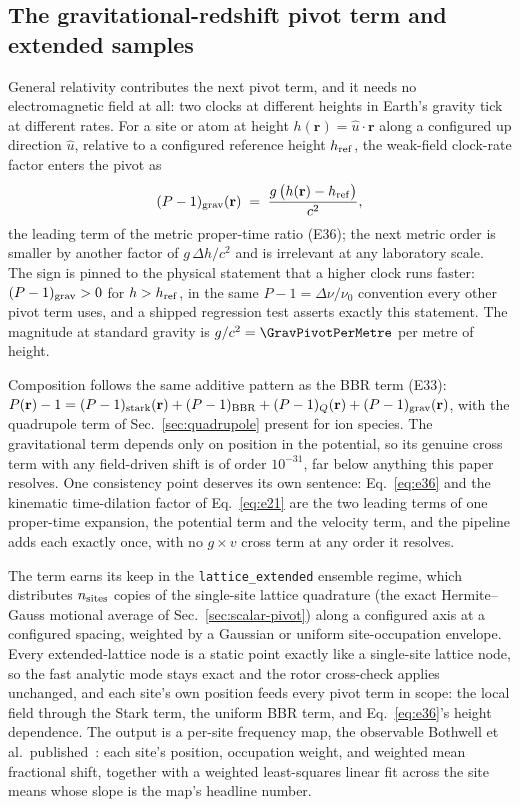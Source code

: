 \documentclass[aps,pra,superscriptaddress,groupedaddress,nofootinbib]{revtex4-2}
\begin{document}
\subsection{The gravitational-redshift pivot term and extended samples}
\label{sec:grav-pivot}

General relativity contributes the next pivot term, and it needs no
electromagnetic field at all: two clocks at different heights in
Earth's gravity tick at different rates. For a site or atom at height
$h(\mathbf{r}) = \hat u\cdot\mathbf{r}$ along a configured up direction
$\hat u$, relative to a configured reference height $h_{\rm ref}$, the
weak-field clock-rate factor enters the pivot as
\begin{equation}
  (P-1)_{\rm grav}(\mathbf{r}) \;=\;
  \frac{g\,\bigl(h(\mathbf{r}) - h_{\rm ref}\bigr)}{c^2} ,
  \label{eq:e36}
\end{equation}
the leading term of the metric proper-time ratio (E36); the next metric
order is smaller by another factor of $g\,\Delta h/c^2$ and is
irrelevant at any laboratory scale. The sign is pinned to the physical
statement that a higher clock runs faster: $(P-1)_{\rm grav}>0$ for
$h>h_{\rm ref}$, in the same $P-1=\Delta\nu/\nu_0$ convention every
other pivot term uses, and a shipped regression test asserts exactly
this statement. The magnitude at standard gravity is
$g/c^2=\GravPivotPerMetre$ per metre of height.

Composition follows the same additive pattern as the BBR term (E33):
$P(\mathbf{r})-1 = (P-1)_{\rm stark}(\mathbf{r}) + (P-1)_{\rm BBR} +
(P-1)_{Q}(\mathbf{r}) + (P-1)_{\rm grav}(\mathbf{r})$, with the
quadrupole term of Sec.~\ref{sec:quadrupole} present for ion species.
The gravitational term depends only on position in the potential, so
its genuine cross term with any field-driven shift is of order
$10^{-31}$, far below anything this paper resolves. One consistency
point deserves its own sentence: Eq.~\eqref{eq:e36} and the kinematic
time-dilation factor of Eq.~\eqref{eq:e21} are the two leading terms of
one proper-time expansion, the potential term and the velocity term,
and the pipeline adds each exactly once, with no $g\times v$ cross term
at any order it resolves.

The term earns its keep in the \texttt{lattice\_extended} ensemble
regime, which distributes $n_{\rm sites}$ copies of the single-site
lattice quadrature (the exact Hermite--Gauss motional average of
Sec.~\ref{sec:scalar-pivot}) along a configured axis at a configured
spacing, weighted by a Gaussian or uniform site-occupation envelope.
Every extended-lattice node is a static point exactly like a
single-site lattice node, so the fast analytic mode stays exact and the
rotor cross-check applies unchanged, and each site's own position feeds
every pivot term in scope: the local field through the Stark term, the
uniform BBR term, and Eq.~\eqref{eq:e36}'s height dependence. The
output is a per-site frequency map, the observable Bothwell et al.\
published~\cite{Bothwell2022}: each site's position, occupation weight,
and weighted mean fractional shift, together with a weighted
least-squares linear fit across the site means whose slope is the
map's headline number.
\end{document}
